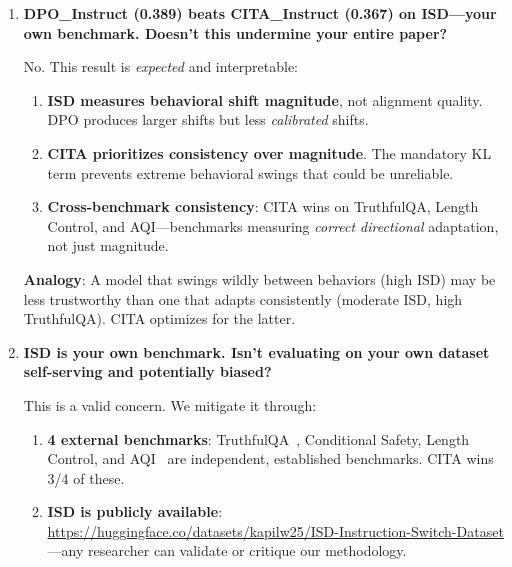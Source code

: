 \begin{enumerate}[label=\textbf{Q\arabic*.}, leftmargin=*, itemsep=8pt]
DPO's wins (ISD, Conditional Safety) reflect higher \textit{absolute} scores, but CITA achieves more \textit{consistent} improvement across diverse benchmarks. Consistency matters for deployment reliability.

\vspace{4mm}

\item \textbf{DPO\_Instruct (0.389) beats CITA\_Instruct (0.367) on ISD---your own benchmark. Doesn't this undermine your entire paper?}

 No. This result is \textit{expected} and interpretable:

\begin{enumerate}[leftmargin=*,itemsep=2pt]
    \item \textbf{ISD measures behavioral shift magnitude}, not alignment quality. DPO produces larger shifts but less \textit{calibrated} shifts.

    \item \textbf{CITA prioritizes consistency over magnitude}. The mandatory KL term prevents extreme behavioral swings that could be unreliable.

    \item \textbf{Cross-benchmark consistency}: CITA wins on TruthfulQA, Length Control, and AQI---benchmarks measuring \textit{correct directional} adaptation, not just magnitude.
\end{enumerate}

\textbf{Analogy}: A model that swings wildly between behaviors (high ISD) may be less trustworthy than one that adapts consistently (moderate ISD, high TruthfulQA). CITA optimizes for the latter.

\vspace{4mm}

\item \textbf{ISD is your own benchmark. Isn't evaluating on your own dataset self-serving and potentially biased?}

 This is a valid concern. We mitigate it through:

\begin{enumerate}[leftmargin=*,itemsep=2pt]
    \item \textbf{4 external benchmarks}: TruthfulQA~\cite{lin2022truthfulqa}, Conditional Safety, Length Control, and AQI~\cite{hendrycks2023aligning} are independent, established benchmarks. CITA wins 3/4 of these.

    \item \textbf{ISD is publicly available}: \url{https://huggingface.co/datasets/kapilw25/ISD-Instruction-Switch-Dataset}---any researcher can validate or critique our methodology.


\end{enumerate}
\end{enumerate}
